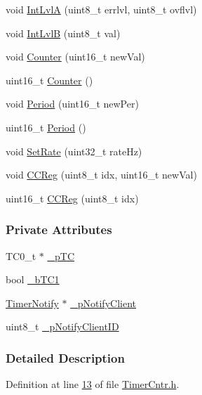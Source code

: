 \begin{DoxyCompactItemize}
void \hyperlink{class_timer_cntr_a3d9d3bca0c89f5dbc69b34406ef6c4be}{IntLvlA} (uint8\_\-t errlvl, uint8\_\-t ovflvl)
\item 
void \hyperlink{class_timer_cntr_a687162461b8b992093f3573356506a8c}{IntLvlB} (uint8\_\-t val)
\item 
void \hyperlink{class_timer_cntr_a483fd3e00603951991333699a1be67ea}{Counter} (uint16\_\-t newVal)
\item 
uint16\_\-t \hyperlink{class_timer_cntr_ae0b24888d24c907aad75ed985431f1a4}{Counter} ()
\item 
void \hyperlink{class_timer_cntr_a3f1c57b8f31a717b5de335cd56408029}{Period} (uint16\_\-t newPer)
\item 
uint16\_\-t \hyperlink{class_timer_cntr_a0b50451ff7454d77aff54ca3274c7b7c}{Period} ()
\item 
void \hyperlink{class_timer_cntr_a00b8456f413fc621b667bc0d2f825623}{SetRate} (uint32\_\-t rateHz)
\item 
void \hyperlink{class_timer_cntr_aa4cead09b55956ef48dd19fcf7a2dea0}{CCReg} (uint8\_\-t idx, uint16\_\-t newVal)
\item 
uint16\_\-t \hyperlink{class_timer_cntr_a8cedc6015da8a1082273071d2eb7c68b}{CCReg} (uint8\_\-t idx)
\end{DoxyCompactItemize}
\subsubsection*{Private Attributes}
\begin{DoxyCompactItemize}
\item 
TC0\_\-t $\ast$ \hyperlink{class_timer_cntr_ae29c58d2e9059e5b3cff07a26dcc5b91}{\_\-pTC}
\item 
bool \hyperlink{class_timer_cntr_a568c634a1b85c88206408c5108500c7b}{\_\-bTC1}
\item 
\hyperlink{class_timer_notify}{TimerNotify} $\ast$ \hyperlink{class_timer_cntr_ab0667571f2dab6ca9f759d9b2c8ce59f}{\_\-pNotifyClient}
\item 
uint8\_\-t \hyperlink{class_timer_cntr_a98b954b9492a11842e511fa21d0131cc}{\_\-pNotifyClientID}
\end{DoxyCompactItemize}


\subsubsection{Detailed Description}


Definition at line \hyperlink{_timer_cntr_8h_source_l00013}{13} of file \hyperlink{_timer_cntr_8h_source}{TimerCntr.h}.



